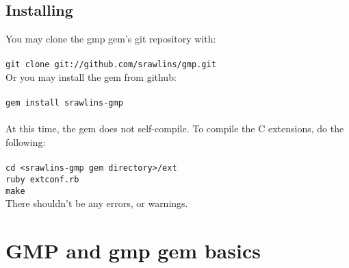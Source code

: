 \documentclass[pdftex,10pt]{article}
\begin{document}
\subsection{Installing}
You may clone the gmp gem's git repository with:\\
\\
\hangindent=0.5cm \texttt{git clone git://github.com/srawlins/gmp.git}\\

Or you may install the gem from github:\\\\

\texttt{gem install srawlins-gmp}\\\\

At this time, the gem does not self-compile. To compile the C extensions, do
the following:\\\\

\hangindent=0.5cm \texttt{cd <srawlins-gmp gem directory>/ext\\
  ruby extconf.rb\\
  make}\\

There shouldn't be any errors, or warnings.

\section{GMP and gmp gem basics}
\end{document}
